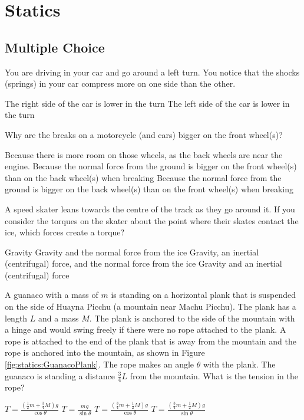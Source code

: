 \section{Statics}

\subsection{Multiple Choice}

\question You are driving in your car and go around a left turn. You notice that the shocks (springs) in your car compress more on one side than the other. 
\begin{checkboxes}
\CorrectChoice The right side of the car is lower in the turn \correct
\choice The left side of the car is lower in the turn
\end{checkboxes}

\question Why are the breaks on a motorcycle (and cars) bigger on the front wheel(s)?
\begin{checkboxes}
\choice Because there is more room on those wheels, as the back wheels are near the engine.
\CorrectChoice Because the normal force from the ground is bigger on the front wheel(s) than on the back wheel(s) when breaking \correct
\choice Because the normal force from the ground is bigger on the back wheel(s) than on the front wheel(s) when breaking
\end{checkboxes}

\question A speed skater leans towards the centre of the track as they go around it. If you consider the torques on the skater about the point where their skates contact the ice, which forces create a torque?
\begin{checkboxes}
\choice Gravity
\choice Gravity and the normal force from the ice
\choice Gravity, an inertial (centrifugal) force,  and the normal force from the ice
\CorrectChoice Gravity and an inertial (centrifugal) force \correct
\end{checkboxes}

\question A guanaco with a mass of $m$ is standing on a horizontal plank that is suspended on the side of Huayna Picchu (a mountain near Machu Picchu). The plank has a length $L$ and a mass $M$. The plank is anchored to the side of the mountain with a hinge and would swing freely if there were no rope attached to the plank. A rope is attached to the end of the plank that is away from the mountain and the rope is anchored into the mountain, as shown in Figure \ref{fig:statics:GuanacoPlank}. The rope makes an angle $\theta$ with the plank. The guanaco is standing a distance $\frac{3}{4}L$ from the mountain. What is the tension in the rope?
\begin{checkboxes} 
\choice $T=\frac{\left( \frac{1}{2}m+ \frac{3}{4}M\right)g}{\cos\theta}$
\choice $T=\frac{mg}{\sin\theta}$
\choice $T=\frac{\left( \frac{3}{4}m+ \frac{1}{2}M\right)g}{\cos\theta}$
\CorrectChoice $T=\frac{\left( \frac{3}{4}m+ \frac{1}{2}M\right)g}{\sin\theta}$ \correct
\end{checkboxes}


